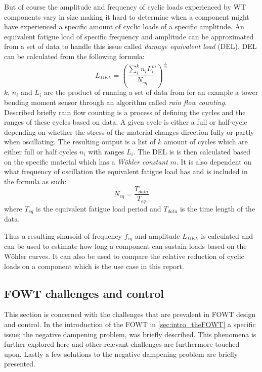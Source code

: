 But of course the amplitude and frequency of cyclic loads experienced by WT components vary in size making it hard to determine when a component might have experienced a specific amount of cyclic loads of a specific amplitude. An equivalent fatigue load of specific frequency and amplitude can be approximated from a set of data to handle this issue called \textit{damage equivalent load} (DEL). DEL can be calculated from the following formula:
\begin{equation}\label{eq:del}
	L_{DEL} = \left( \dfrac{\sum_{i}^{k}n_i L_i^m}{N_{eq}} \right)^{\frac{1}{m}}
\end{equation}
$ k $, $ n_i $ and $ L_i $ are the product of running a set of data from for an example a tower bending moment sensor through an algorithm called \textit{rain flow counting}. Described briefly rain flow counting is a process of defining the cycles and the ranges of these cycles based on data. A given cycle is either a full or half-cycle depending on whether the stress of the material changes direction fully or partly when oscillating. The resulting output is a list of $ k $ amount of cycles which are either full or half cycles $ n_i $ with ranges $ L_i $. The DEL is is then calculated based on the specific material which has a \textit{Wöhler constant} $ m $. It is also dependent on what frequency of oscillation the equivalent fatigue load has and is included in the formula as such:
\begin{equation}\label{key}
	N_{eq} = \dfrac{T_{data}}{T_{eq}}
\end{equation} 
where $ T_{eq} $ is the equivalent fatigue load period and $ T_{data} $ is the time length of the data.

Thus a resulting sinusoid of frequency $ f_{eq} $ and amplitude $ L_{DEL} $ is calculated and can be used to estimate how long a component can sustain loads based on the Wöhler curves. It can also be used to compare the relative reduction of cyclic loads on a component which is the use case in this report.


\subsection{FOWT challenges and control} \label{sec:theory_fowt_challenges}
This section is concerned with the challenges that are prevalent in FOWT design and control. In the introduction of the FOWT in \cref{sec:intro_theFOWT} a specific issue; the negative dampening problem, was briefly described. This phenomena is further explored here and other relevant challenges are furthermore touched upon. Lastly a few solutions to the negative dampening problem are briefly presented.


